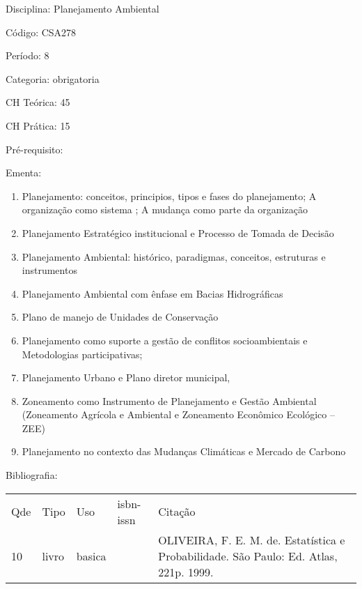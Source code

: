\documentclass[12pt,a4paper,twoside]{report}
\begin{document}
Disciplina: Planejamento Ambiental

Código: CSA278

Período: 8

Categoria: obrigatoria

CH Teórica: 45

CH Prática: 15




Pré-requisito:
\begin{enumerate}
\end{enumerate}

Ementa:
\begin{enumerate}
\item Planejamento: conceitos, principios, tipos e fases do planejamento; A organização como sistema ; A mudança como parte da organização
\item Planejamento Estratégico institucional e Processo de Tomada de Decisão
\item Planejamento Ambiental: histórico, paradigmas, conceitos, estruturas e instrumentos
\item Planejamento Ambiental com ênfase em Bacias Hidrográficas
\item Plano de manejo de Unidades de Conservação
\item Planejamento como suporte a gestão de conflitos socioambientais e Metodologias participativas;
\item Planejamento Urbano e Plano diretor municipal,
\item Zoneamento como Instrumento de Planejamento e Gestão Ambiental (Zoneamento Agrícola e Ambiental e  Zoneamento Econômico Ecológico – ZEE)
\item Planejamento no contexto das Mudanças Climáticas e Mercado de Carbono
\end{enumerate}



Bibliografia:


\begin{tabular}{llllp{8cm}}
Qde & Tipo & Uso & isbn-issn & Citação \\
10&livro&basica&&OLIVEIRA, F. E. M. de. Estatística e Probabilidade. São Paulo: Ed. Atlas, 221p. 1999.\\
\end{tabular}
\end{document}
